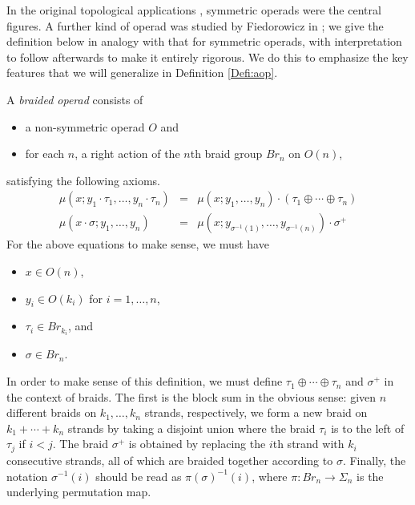 \documentclass{amsbook} %
\numberwithin{section}{chapter}
\begin{document}
In the original topological applications \cite{maygeom}, symmetric operads were the central figures.  A further kind of operad was studied by Fiedorowicz in \cite{fie-br}; we give the definition below in analogy with that for symmetric operads, with interpretation to follow afterwards to make it entirely rigorous.  We do this to emphasize the key features that we will generalize in Definition \ref{Defi:aop}.

\begin{Defi}\label{broperad}
A \textit{braided operad} consists of
\begin{itemize}
\item a non-symmetric operad $O$ and
\item for each $n$, a right action of the $n$th braid group $Br_{n}$ on $O(n)$,
\end{itemize}
satisfying the following axioms.
\[
\begin{array}{rcl}
\mu(x; y_{1} \cdot \tau_{1}, \ldots, y_{n} \cdot \tau_{n}) & = & \mu(x; y_{1}, \ldots, y_{n}) \cdot (\tau_{1} \oplus \cdots \oplus \tau_{n}) \\
\mu(x \cdot \sigma; y_{1}, \ldots, y_{n}) & =  & \mu(x; y_{\sigma^{-1}(1)}, \ldots, y_{\sigma^{-1}(n)}) \cdot \sigma^{+}
\end{array}
\]
For the above equations to make sense, we must have
\begin{itemize}
\item $x \in O(n)$,
\item $y_{i} \in O(k_{i})$ for $i=1, \ldots, n$,
\item $\tau_{i} \in Br_{k_{i}}$, and
\item $\sigma \in Br_{n}$.
\end{itemize}
\end{Defi}

In order to make sense of this definition, we must define $\tau_{1} \oplus \cdots \oplus \tau_{n}$ and $\sigma^{+}$ in the context of braids.  The first is the block sum in the obvious sense:  given $n$ different braids on $k_{1}, \ldots, k_{n}$ strands, respectively, we form a new braid on $k_{1} + \cdots + k_{n}$ strands by taking a disjoint union where the braid $\tau_{i}$ is to the left of $\tau_{j}$ if $i < j$.  The braid $\sigma^{+}$ is obtained by replacing the $i$th strand with $k_{i}$ consecutive strands, all of which are braided together according to $\sigma$.  Finally, the notation $\sigma^{-1}(i)$ should be read as $\pi(\sigma)^{-1}(i)$, where $\pi:Br_{n} \rightarrow \Sigma_{n}$ is the underlying permutation map.
\end{document}
